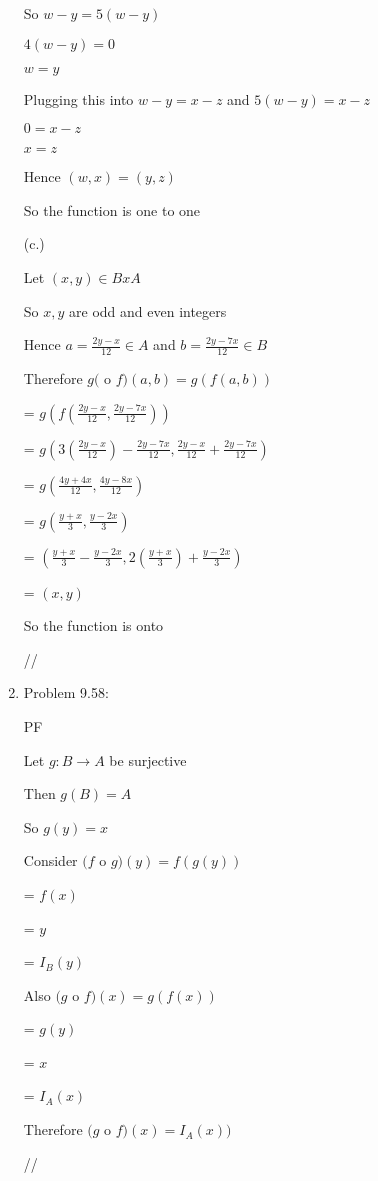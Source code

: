 \documentclass[12pt]{article}
\begin{document}
\begin{enumerate}
{So $w-y = 5(w-y)$

$4(w-y) = 0$

$w = y$

Plugging this into $w-y = x-z$ and $5(w-y) = x - z$


$0 = x-z$

$x = z$

Hence $(w,x) = (y,z)$

So the function is one to one


(c.)

Let $(x,y) \in B x A$

So $x,y$ are odd and even integers

Hence $ a = \frac{2y - x}{12} \in A$ and $ b = \frac{2y - 7x}{12} \in B$

Therefore $g($ o $f)(a,b) = g(f(a,b))$

= $g(f(\frac{2y - x}{12} , \frac{2y-7x}{12} ))$

= $g(3(\frac{2y-x}{12}) - \frac{2y - 7x}{12}, \frac{2y-x}{12} + \frac{2y - 7x}{12})$

= $g( \frac{4y + 4x}{12}, \frac{4y - 8x}{12})$

= $g( \frac{y + x}{3}, \frac{y -2x}{3})$

= $( \frac{y+x}{3} - \frac{y - 2x}{3}, 2( \frac{y+x}{3} )+ \frac{y-2x}{3})$

= $(x,y)$

So the function is onto

//
}


\item Problem 9.58:

{PF

Let $g: B \rightarrow A$ be surjective

Then $g(B) = A$

So $g(y) = x$

Consider $(f$ o $g)(y) = f(g(y))$

= $f(x)$

= $y$

= $I_B (y)$

Also  $(g$ o $f)(x) = g(f(x))$

= $g(y)$

= $x$

= $I_A (x)$

Therefore $(g$ o $f)(x) = I_A(x))$



//
}


\end{enumerate}
\end{document}

